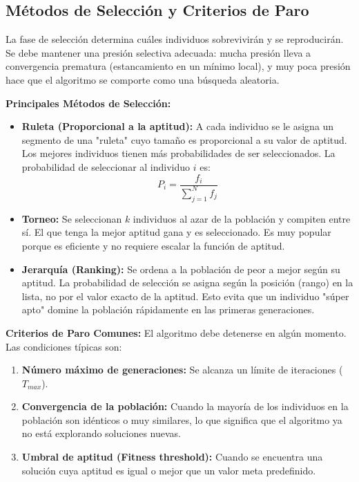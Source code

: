 \documentclass{article}
\begin{document}
	\subsection{Métodos de Selección y Criterios de Paro}
	
	La fase de selección determina cuáles individuos sobrevivirán y se reproducirán. Se debe mantener una presión selectiva adecuada: mucha presión lleva a convergencia prematura (estancamiento en un mínimo local), y muy poca presión hace que el algoritmo se comporte como una búsqueda aleatoria.
	
	\textbf{Principales Métodos de Selección:}
	\begin{itemize}
		\item \textbf{Ruleta (Proporcional a la aptitud):} A cada individuo se le asigna un segmento de una "ruleta" cuyo tamaño es proporcional a su valor de aptitud. Los mejores individuos tienen más probabilidades de ser seleccionados. La probabilidad de seleccionar al individuo $i$ es: 
		$$P_i = \frac{f_i}{\sum_{j=1}^{N} f_j}$$
		\item \textbf{Torneo:} Se seleccionan $k$ individuos al azar de la población y compiten entre sí. El que tenga la mejor aptitud gana y es seleccionado. Es muy popular porque es eficiente y no requiere escalar la función de aptitud.
		\item \textbf{Jerarquía (Ranking):} Se ordena a la población de peor a mejor según su aptitud. La probabilidad de selección se asigna según la posición (rango) en la lista, no por el valor exacto de la aptitud. Esto evita que un individuo "súper apto" domine la población rápidamente en las primeras generaciones.
	\end{itemize}
	
	\textbf{Criterios de Paro Comunes:}
	El algoritmo debe detenerse en algún momento. Las condiciones típicas son:
	\begin{enumerate}
		\item \textbf{Número máximo de generaciones:} Se alcanza un límite de iteraciones ($T_{max}$).
		\item \textbf{Convergencia de la población:} Cuando la mayoría de los individuos en la población son idénticos o muy similares, lo que significa que el algoritmo ya no está explorando soluciones nuevas.
		\item \textbf{Umbral de aptitud (Fitness threshold):} Cuando se encuentra una solución cuya aptitud es igual o mejor que un valor meta predefinido.
	\end{enumerate}
	
\end{document}
